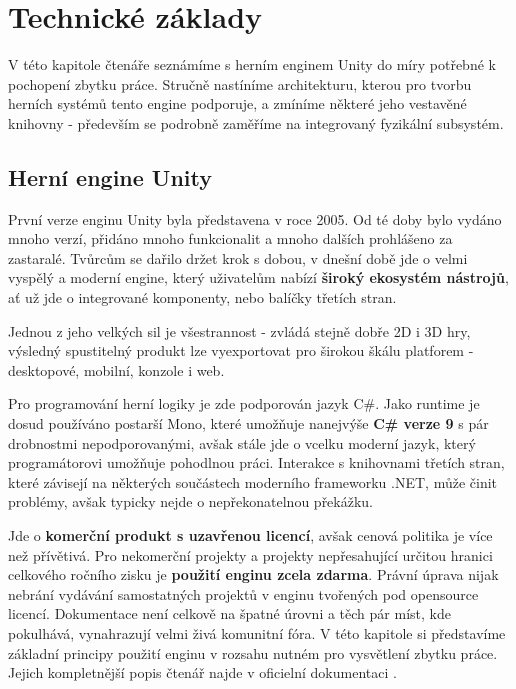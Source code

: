 \chapter{Technické základy}

V této kapitole čtenáře seznámíme s herním enginem Unity \cite{Unity} do míry potřebné k pochopení zbytku práce. Stručně nastíníme architekturu, kterou pro tvorbu herních systémů tento engine podporuje, a zmíníme některé jeho vestavěné knihovny - především se podrobně zaměříme na integrovaný fyzikální subsystém.


\section{Herní engine Unity} \label{unityEngineIntroSection}

První verze enginu Unity byla představena v roce 2005. Od té doby bylo vydáno mnoho verzí, přidáno mnoho funkcionalit a mnoho dalších prohlášeno za zastaralé. Tvůrcům se dařilo držet krok s dobou, v dnešní době jde o velmi vyspělý a moderní engine, který uživatelům nabízí \textbf{široký ekosystém nástrojů}, ať už jde o integrované komponenty, nebo balíčky třetích stran. 

Jednou z jeho velkých sil je všestrannost - zvládá stejně dobře 2D i 3D hry, výsledný spustitelný produkt lze vyexportovat pro širokou škálu platforem - desktopové, mobilní, konzole i web.

Pro programování herní logiky je zde podporován jazyk C\#. Jako runtime je dosud používáno postarší Mono, které umožňuje nanejvýše \textbf{C\# verze 9} s pár drobnostmi nepodporovanými, avšak stále jde o vcelku moderní jazyk, který programátorovi umožňuje pohodlnou práci. Interakce s knihovnami třetích stran, které závisejí na některých součástech moderního frameworku .NET, může činit problémy, avšak typicky nejde o nepřekonatelnou překážku.

Jde o \textbf{komerční produkt s uzavřenou licencí}, avšak cenová politika je více než přívětivá. Pro nekomerční projekty a projekty nepřesahující určitou hranici celkového ročního zisku je \textbf{použití enginu zcela zdarma}. Právní úprava nijak nebrání vydávání samostatných projektů v enginu tvořených pod opensource licencí. Dokumentace není celkově na špatné úrovni a těch pár míst, kde pokulhává, vynahrazují velmi živá komunitní fóra.
\bigbreak
V této kapitole si představíme základní principy použití enginu v rozsahu nutném pro vysvětlení zbytku práce. Jejich kompletnější popis čtenář najde v oficielní dokumentaci \cite{Unity}. 

